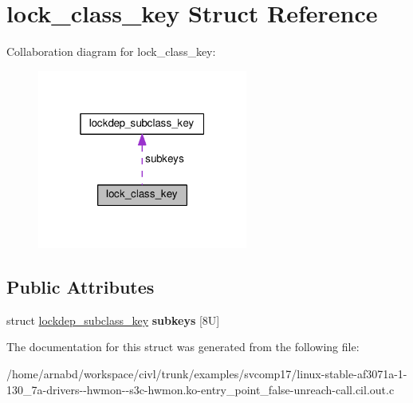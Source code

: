 \hypertarget{structlock__class__key}{}\section{lock\+\_\+class\+\_\+key Struct Reference}
\label{structlock__class__key}


Collaboration diagram for lock\+\_\+class\+\_\+key\+:
\nopagebreak
\begin{figure}[H]
\begin{center}
\leavevmode
\includegraphics[width=196pt]{structlock__class__key__coll__graph}
\end{center}
\end{figure}
\subsection*{Public Attributes}
\begin{DoxyCompactItemize}
\item 
\hypertarget{structlock__class__key_a6620b39bfeb34e7bbd5f7b4692c0a6a5}{}struct \hyperlink{structlockdep__subclass__key}{lockdep\+\_\+subclass\+\_\+key} {\bfseries subkeys} \mbox{[}8\+U\mbox{]}\label{structlock__class__key_a6620b39bfeb34e7bbd5f7b4692c0a6a5}

\end{DoxyCompactItemize}


The documentation for this struct was generated from the following file\+:\begin{DoxyCompactItemize}
\item 
/home/arnabd/workspace/civl/trunk/examples/svcomp17/linux-\/stable-\/af3071a-\/1-\/130\+\_\+7a-\/drivers-\/-\/hwmon-\/-\/s3c-\/hwmon.\+ko-\/entry\+\_\+point\+\_\+false-\/unreach-\/call.\+cil.\+out.\+c\end{DoxyCompactItemize}
